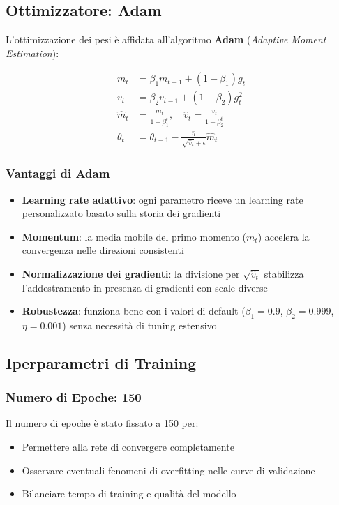 \subsection{Ottimizzatore: Adam}

L'ottimizzazione dei pesi è affidata all'algoritmo \textbf{Adam} (\textit{Adaptive Moment Estimation}):

\begin{align}
    m_t &= \beta_1 m_{t-1} + (1 - \beta_1) g_t \\
    v_t &= \beta_2 v_{t-1} + (1 - \beta_2) g_t^2 \\
    \hat{m}_t &= \frac{m_t}{1 - \beta_1^t}, \quad \hat{v}_t = \frac{v_t}{1 - \beta_2^t} \\
    \theta_t &= \theta_{t-1} - \frac{\eta}{\sqrt{\hat{v}_t} + \epsilon} \hat{m}_t
\end{align}

\subsubsection{Vantaggi di Adam}

\begin{itemize}
    \item \textbf{Learning rate adattivo}: ogni parametro riceve un learning rate personalizzato basato sulla storia dei gradienti
    \item \textbf{Momentum}: la media mobile del primo momento ($m_t$) accelera la convergenza nelle direzioni consistenti
    \item \textbf{Normalizzazione dei gradienti}: la divisione per $\sqrt{\hat{v}_t}$ stabilizza l'addestramento in presenza di gradienti con scale diverse
    \item \textbf{Robustezza}: funziona bene con i valori di default ($\beta_1 = 0.9$, $\beta_2 = 0.999$, $\eta = 0.001$) senza necessità di tuning estensivo
\end{itemize}

\subsection{Iperparametri di Training}

\subsubsection{Numero di Epoche: 150}

Il numero di epoche è stato fissato a 150 per:
\begin{itemize}
    \item Permettere alla rete di convergere completamente
    \item Osservare eventuali fenomeni di overfitting nelle curve di validazione
    \item Bilanciare tempo di training e qualità del modello
\end{itemize}

